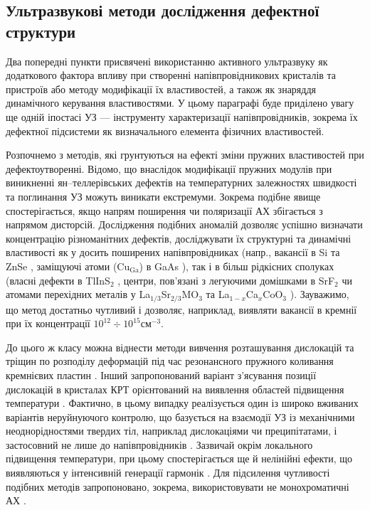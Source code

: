 \subsection{Ультразвукові методи дослідження дефектної структури\label{secUSMethod}}

Два попередні пункти присвячені використанню активного ультразвуку як додаткового фактора впливу при створенні напівпровідникових кристалів та пристроїв або  методу модифікації їх властивостей, а також як знаряддя динамічного керування властивостями.
У цьому параграфі буде приділено увагу ще одній іпостасі УЗ --- інструменту характеризації напівпровідників, зокрема їх дефектної підсистеми як визначального елемента фізичних властивостей.


Розпочнемо з методів, які грунтуються на ефекті зміни пружних властивостей при дефектоутворенні.
 Відомо, що внаслідок модифікації пружних модулів при виникненні ян--теллерівських дефектів на температурних залежностях швидкості та поглинання УЗ можуть виникати екстремуми.
Зокрема подібне явище спостерігається, якщо напрям поширення чи поляризації АХ збігається з напрямом дисторсій.
Дослідження подібних аномалій дозволяє успішно визначати концентрацію різноманітних дефектів, досліджувати їх структурні та динамічні властивості
як у досить поширених напівпровідниках (напр., вакансії в Si \cite{USM:Goto2006,USM:Okabe2013,USM:Mitsumoto2014,USM:Akatsu2009} та ZnSe \cite{USM:Averkin2014},
заміщуючі атоми (Cu$_\text{Ga}$) в GaAs \cite{USM:Averkin2014:2}),
так і в більш рідкісних сполуках (власні дефекти в TlInS$_2$ \cite{USM:SEYIDOV2016}, центри, пов'язані з легуючими домішками в SrF$_2$ \cite{USM:Zhevstovskikh} чи атомами перехідних металів у La$_{1/3}$Sr$_{2/3}$MO$_3$ \cite{USM:HUI2012} та La$_{1-x}$Ca$_x$CoO$_3$ \cite{USM:YI2009}).
Зауважимо, що метод достатньо чутливий і дозволяє, наприклад, виявляти вакансії в кремнії  при їх концентрації $10^{12}\div10^{15}$см$^{-3}$.


До цього ж класу можна віднести методи вивчення розташування дислокацій та тріщин по розподілу деформацій під час резонансного пружного коливання кремнієвих пластин \cite{BELYAEV2001,OstapConf2,OstapConf3,Ostap:Method}.
Інший запропонований варіант з'ясування позиції дислокацій в кристалах КРТ орієнтований на виявлення областей підвищення температури \cite{savkina2004disl,SAVKINA2005disl}.
Фактично, в цьому випадку реалізується один із широко вживаних варіантів неруйнуючого контролю, що базується на взаємодії УЗ із механічними неоднорідностями твердих тіл, наприклад дислокаціями чи преципітатами, і застосовний не лише до напівпровідників \cite{USM:NDEsteel}.
Зазвичай окрім локального підвищення температури, при цьому спостерігається ще й нелінійні ефекти, що виявляються у інтенсивній генерації гармонік \cite{USM:NDEsteel,USM:NDE}.
Для підсилення чутливості подібних методів запропоновано, зокрема, використовувати не монохроматичні АХ  \cite{USM:NDE}.

